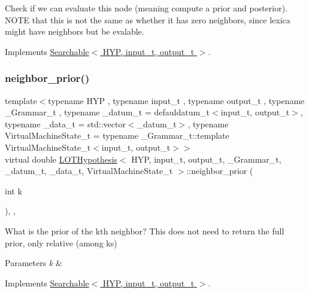 Check if we can evaluate this node (meaning compute a prior and posterior). N\+O\+TE that this is not the same as whether it has zero neighbors, since lexica might have neighbors but be evalable. 



Implements \hyperlink{class_searchable_a23786e95730117c3cc4b90e010494a1e}{Searchable$<$ H\+Y\+P, input\+\_\+t, output\+\_\+t $>$}.

\mbox{\label{class_l_o_t_hypothesis_a34fb9e13bc6855d6599c1c3e62d88933}} 
\subsubsection{\texorpdfstring{neighbor\+\_\+prior()}{neighbor\_prior()}}
{\footnotesize\ttfamily template$<$typename H\+YP , typename input\+\_\+t , typename output\+\_\+t , typename \+\_\+\+Grammar\+\_\+t , typename \+\_\+datum\+\_\+t  = defauldatum\+\_\+t$<$input\+\_\+t, output\+\_\+t$>$, typename \+\_\+data\+\_\+t  = std\+::vector$<$\+\_\+datum\+\_\+t$>$, typename Virtual\+Machine\+State\+\_\+t  = typename \+\_\+\+Grammar\+\_\+t\+::template Virtual\+Machine\+State\+\_\+t$<$input\+\_\+t, output\+\_\+t$>$$>$ \\
virtual double \hyperlink{class_l_o_t_hypothesis}{L\+O\+T\+Hypothesis}$<$ H\+YP, input\+\_\+t, output\+\_\+t, \+\_\+\+Grammar\+\_\+t, \+\_\+datum\+\_\+t, \+\_\+data\+\_\+t, Virtual\+Machine\+State\+\_\+t $>$\+::neighbor\+\_\+prior (\begin{DoxyParamCaption}\item[{int}]{k }\end{DoxyParamCaption})\hspace{0.3cm}{\ttfamily [inline]}, {\ttfamily [override]}, {\ttfamily [virtual]}}



What is the prior of the k\textquotesingle{}th neighbor? This does not need to return the full prior, only relative (among ks) 


\begin{DoxyParams}{Parameters}
{\em k} & \\
\hline
\end{DoxyParams}


Implements \hyperlink{class_searchable_abebbaaf94b0502a35d0ba686af73bd08}{Searchable$<$ H\+Y\+P, input\+\_\+t, output\+\_\+t $>$}.


